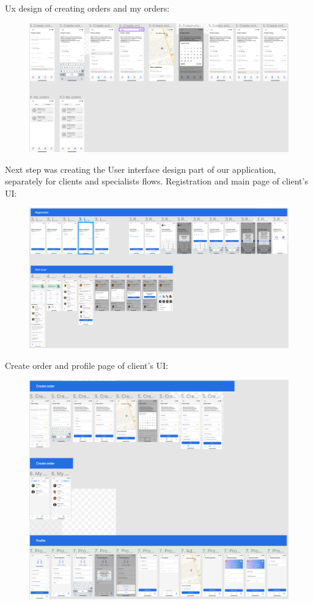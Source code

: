 Ux design of creating orders and my orders:
\begin{figure}[H]
    \centering
    \includegraphics[scale=0.53]{images/design4.png}
\end{figure}
Next step was creating the User interface design part of our application, separately for clients and specialists flows. \newline
Registration and main page of client’s UI:
\begin{figure}[H]
    \centering
    \includegraphics[scale=0.75]{images/design6.png}
\end{figure}
Create order and profile page of client’s UI:
\begin{figure}[H]
    \centering
    \includegraphics[scale=0.75]{images/design7.png}
\end{figure}
